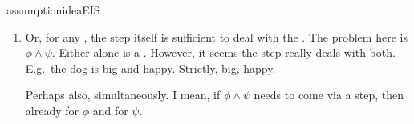 \begin{note}
\begin{restatable}{assumption}{ideaEIS}
\begin{enumerate}
\begin{enumerate}[label=\alph*., ref=(\alph*)]
      \item
        Or, for any \requ{}, the step itself is sufficient to deal with the \requ{}. {\color{red} The problem here is \(\phi \land \psi\). Either alone is a \requ{}. However, it seems the step really deals with both.}
        E.g.\ the dog is big and happy.
        Strictly, big, happy.

        Perhaps also, simultaneously.
        I mean, if \(\phi \land \psi\) needs to come via a step, then already for \(\phi\) and for \(\psi\).
      \end{enumerate}
    \end{enumerate}
    \vspace{-\baselineskip}
  \end{restatable}
\end{note}

